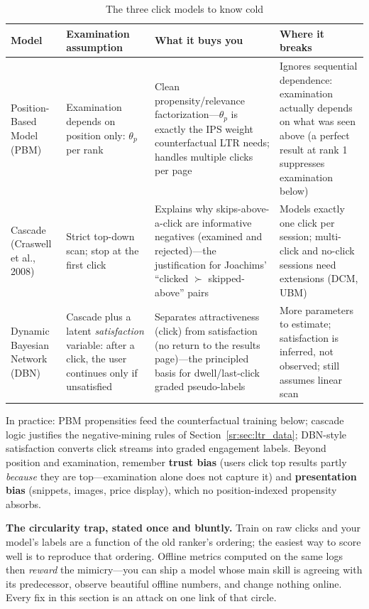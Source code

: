\begin{table}[H]
\centering
\small
\caption{The three click models to know cold}
\label{sr:tab:click_models}
\begin{tabularx}{\textwidth}{lXXX}
\toprule
\textbf{Model} & \textbf{Examination assumption} & \textbf{What it buys you} & \textbf{Where it breaks} \\
\midrule
Position-Based Model (PBM) & Examination depends on position only: $\theta_p$ per rank & Clean propensity/relevance factorization---$\theta_p$ is exactly the IPS weight counterfactual LTR needs; handles multiple clicks per page & Ignores sequential dependence: examination actually depends on what was seen above (a perfect result at rank 1 suppresses examination below) \\
Cascade (Craswell et al., 2008) & Strict top-down scan; stop at the first click & Explains why skips-above-a-click are informative negatives (examined and rejected)---the justification for Joachims' ``clicked $\succ$ skipped-above'' pairs & Models exactly one click per session; multi-click and no-click sessions need extensions (DCM, UBM) \\
Dynamic Bayesian Network (DBN) & Cascade plus a latent \textit{satisfaction} variable: after a click, the user continues only if unsatisfied & Separates attractiveness (click) from satisfaction (no return to the results page)---the principled basis for dwell/last-click graded pseudo-labels & More parameters to estimate; satisfaction is inferred, not observed; still assumes linear scan \\
\bottomrule
\end{tabularx}
\end{table}

In practice: PBM propensities feed the counterfactual training below; cascade logic justifies the negative-mining rules of Section~\ref{sr:sec:ltr_data}; DBN-style satisfaction converts click streams into graded engagement labels. Beyond position and examination, remember \textbf{trust bias} (users click top results partly \textit{because} they are top---examination alone does not capture it) and \textbf{presentation bias} (snippets, images, price display), which no position-indexed propensity absorbs.

\begin{warningbox}
\textbf{The circularity trap, stated once and bluntly.} Train on raw clicks and your model's labels are a function of the old ranker's ordering; the easiest way to score well is to reproduce that ordering. Offline metrics computed on the same logs then \textit{reward} the mimicry---you can ship a model whose main skill is agreeing with its predecessor, observe beautiful offline numbers, and change nothing online. Every fix in this section is an attack on one link of that circle.
\end{warningbox}

